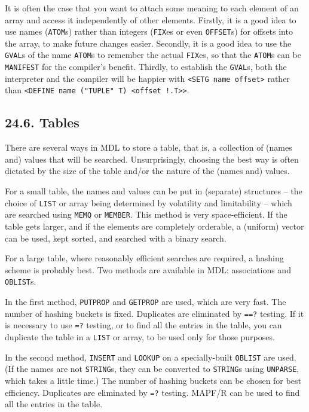 \documentclass[a4paper,]{article}
\begin{document}
It is often the case that you want to attach some meaning to each element of an array and access it independently of other
elements. Firstly, it is a good idea to use names (\texttt{ATOM}s) rather than integers (\texttt{FIX}es or even
\texttt{OFFSET}s) for offsets into the array, to make future changes easier. Secondly, it is a good idea to use the
\texttt{GVAL}s of the name \texttt{ATOM}s to remember the actual \texttt{FIX}es, so that the \texttt{ATOM}s can be
\texttt{MANIFEST} for the compiler's benefit. Thirdly, to establish the \texttt{GVAL}s, both the interpreter and the
compiler will be happier with \texttt{\textless{}SETG\ name\ offset\textgreater{}} rather than
\texttt{\textless{}DEFINE\ name\ ("TUPLE"\ T)\ \textless{}offset\ !.T\textgreater{}\textgreater{}}.

\subsection{24.6. Tables}\label{tables}

There are several ways in MDL to store a table, that is, a collection of (names and) values that will be searched.
Unsurprisingly, choosing the best way is often dictated by the size of the table and/or the nature of the (names and)
values.

For a small table, the names and values can be put in (separate) structures -- the choice of \texttt{LIST} or array being
determined by volatility and limitability -- which are searched using \texttt{MEMQ} or \texttt{MEMBER}. This method is very
space-efficient. If the table gets larger, and if the elements are completely orderable, a (uniform) vector can be used,
kept sorted, and searched with a binary search.

For a large table, where reasonably efficient searches are required, a hashing scheme is probably best. Two methods are
available in MDL: associations and \texttt{OBLIST}s.

In the first method, \texttt{PUTPROP} and \texttt{GETPROP} are used, which are very fast. The number of hashing buckets is
fixed. Duplicates are eliminated by \texttt{==?} testing. If it is necessary to use \texttt{=?} testing, or to find all the
entries in the table, you can duplicate the table in a \texttt{LIST} or array, to be used only for those purposes.

In the second method, \texttt{INSERT} and \texttt{LOOKUP} on a specially-built \texttt{OBLIST} are used. (If the names are
not \texttt{STRING}s, they can be converted to \texttt{STRING}s using \texttt{UNPARSE}, which takes a little time.) The
number of hashing buckets can be chosen for best efficiency. Duplicates are eliminated by \texttt{=?} testing. MAPF/R can
be used to find all the entries in the table.
\end{document}
